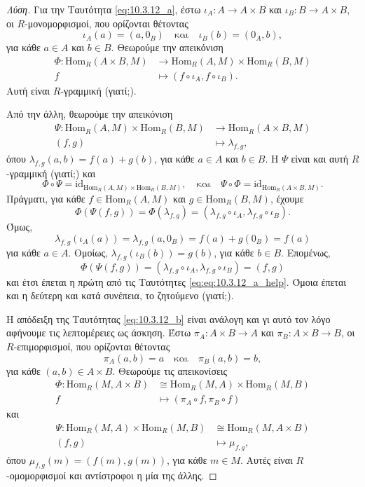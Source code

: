\documentclass[12pt,a4paper,reqno]{amsart}
\theoremstyle{definition}
\renewcommand{\to}{\rightarrow}
\newcommand{\rmid}{\mathrm{id}}
\newcommand{\Hom}{\mathrm{Hom}}
\begin{document}
\begin{proof}[Λύση]
  Για την Ταυτότητα \eqref{eq:10.3.12_a}, έστω $\iota_A : A \to A\times{B}$ και $\iota_B : B \to A\times{B}$, οι  $R$-μονομορφισμοί, που ορίζονται θέτοντας 
  \[
  \iota_A(a) = (a,0_B) \quad \text{και} \quad \iota_B(b) = (0_A,b),
  \]
  για κάθε $a \in A$ και $b \in B$. Θεωρούμε την απεικόνιση 
  \begin{align*}
    \Phi : \Hom_R(A\times{B},M) &\to \Hom_R(A,M) \times \Hom_R(B,M) \\
    f &\mapsto (f \circ \iota_A, f \circ \iota_B). 
  \end{align*}
  Αυτή είναι $R$-γραμμική (γιατί;).
  
  Από την άλλη, θεωρούμε την απεικόνιση 
  \begin{align*}
    \Psi : \Hom_R(A,M) \times \Hom_R(B,M) &\to \Hom_R(A\times{B},M)  \\
    (f,g) &\mapsto \lambda_{f,g}, 
  \end{align*}
  όπου $\lambda_{f,g}(a,b) = f(a) + g(b)$, για κάθε $a \in A$ και $b \in B$. Η $\Psi$ είναι και αυτή $R$-γραμμική (γιατί;) και 
  \begin{equation}
    \label{eq:eq:10.3.12_a_help}
    \Phi\circ\Psi = \rmid_{\Hom_R(A,M) \times \Hom_R(B,M)}, \quad \text{και} \quad \Psi\circ\Phi = \rmid_{\Hom_R(A\times{B},M)}.
  \end{equation}
  Πράγματι, για κάθε $f \in \Hom_R(A,M)$ και $g \in \Hom_R(B,M)$, έχουμε 
  \[
    \Phi(\Psi(f,g)) = \Phi(\lambda_{f,g}) = (\lambda_{f,g}\circ\iota_A, \lambda_{f,g}\circ\iota_B).
  \]
  Όμως, 
  \[
  \lambda_{f,g}\left(
    \iota_A(a)
  \right) = \lambda_{f,g}(a,0_B) = f(a) + g(0_B) = f(a)
  \]
  για κάθε $a \in A$. Ομοίως, $\lambda_{f,g}\left(
    \iota_B(b)
  \right) = g(b)$, για κάθε $b \in B$. Επομένως, 
  \[
  \Phi(\Psi(f,g)) = (\lambda_{f,g}\circ\iota_A, \lambda_{f,g}\circ\iota_B) = (f,g)
  \]
  και έτσι έπεται η πρώτη από τις Ταυτότητες \eqref{eq:eq:10.3.12_a_help}. Όμοια έπεται και η δεύτερη και κατά συνέπεια, το ζητούμενο (γιατί;).

  Η απόδειξη της Ταυτότητας \eqref{eq:10.3.12_b} είναι ανάλογη και γι αυτό τον λόγο αφήνουμε τις λεπτομέρειες ως άσκηση. Έστω $\pi_A : A\times{B} \to A $ και $\pi_B : A\times{B} \to B$, οι  $R$-επιμορφισμοί, που ορίζονται θέτοντας 
  \[
  \pi_A(a,b) = a \quad \text{και} \quad \pi_B(a,b) = b,
  \]
  για κάθε $(a,b) \in A\times B$. Θεωρούμε τις απεικονίσεις
  \begin{align*}
    \Phi : \Hom_R(M,A\times{B}) &\cong \Hom_R(M,A) \times \Hom_R(M,B) \\
    f &\mapsto (\pi_A\circ f, \pi_B\circ f) 
  \end{align*}
  και
  \begin{align*}
    \Psi : \Hom_R(M,A) \times \Hom_R(M,B) &\cong \Hom_R(M,A\times{B})  \\
    (f,g) &\mapsto \mu_{f,g}, 
  \end{align*}
  όπου $\mu_{f,g}(m) = \left(f(m), g(m)\right)$, για κάθε $m \in M$. Αυτές είναι $R$-ομομορφισμοί και αντίστροφοι η μία της άλλης.
\end{proof}
\end{document}

